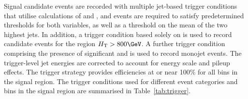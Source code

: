 Signal candidate events are recorded with multiple jet-based trigger
conditions that utilise calculations of \scalht and \alphat, and
events are required to satisfy predetermined thresholds for both
variables, as well as a threshold on the mean \Pt of the two highest
\Pt jets. In addition, a trigger condition based solely on \scalht is
used to record candidate events for the region $\scalht > 800\GeV$. A
further trigger condition comprising the presence of significant
\HTmiss and \ETmiss is used to record monojet events. The
trigger-level jet energies are corrected to account for energy scale
and pileup effects. The trigger strategy provides efficiencies at or
near 100\% for all bins in the signal region. The trigger conditions
used for different event categories and \scalht bins in the signal
region are summarised in Table~\ref{tab:trigger}.

